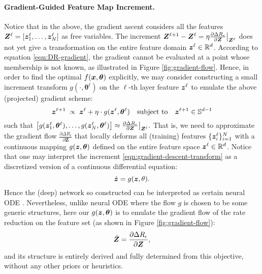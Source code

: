 \documentclass[\toplevelprefix/book-main.tex]{subfiles}
\begin{document}
\paragraph{Gradient-Guided Feature Map Increment.} Notice that in the above, the gradient ascent considers all the features $\bm{Z}^{\ell} = [\bm{z}^{\ell}_{1}, \dots, \bm{z}^{\ell}_{N}]$ as free variables. The increment $\bm{Z}^{\ell+1} - \bm{Z}^{\ell} = \eta \frac{\partial \Delta R_{\epsilon}}{\partial \bm Z}\big|_{\bm{Z}^\ell}$ does not yet give a transformation on the entire feature domain $\bm{z}^\ell \in \mathbb{R}^d$. According to equation \eqref{eqn:DR-gradient}, the gradient cannot be evaluated at a point whose membership is not known, as illustrated in Figure \ref{fig:gradient-flow}. Hence, in order to find the optimal $f(\bm{x},\bm  \theta)$ explicitly, we may consider constructing a small increment transform $g(\cdot, \bm{\theta}^{\ell})$ on the $\ell$-th layer feature $\bm{z}^\ell$ to emulate the above (projected) gradient scheme:
\begin{equation}
\bm{z}^{\ell + 1}   \; \propto \; \bm{z}^{\ell} + \eta\cdot  g(\bm{z}^{\ell}, \bm{\theta}^{\ell}) \quad \mbox{subject to} \quad \bm{z}^{\ell +1} \in \mathbb{S}^{d-1}
\label{eqn:gradient-descent-transform}
\end{equation}
such that $\big[g(\bm{z}_1^{\ell}, \bm \theta^{\ell}), \ldots, g(\bm{z}_N^{\ell}, \bm \theta^{\ell}) \big] \approx \frac{\partial \Delta R_{\epsilon}}{\partial \bm Z}\big|_{\bm{Z}^\ell}.$ That is, we need to approximate the gradient flow $\frac{\partial \Delta R_{\epsilon}}{\partial \bm Z}$ that locally deforms all (training) features $\{\bm{z}_i^\ell\}_{i=1}^N$ with a continuous mapping $g(\bm{z},\bm \theta)$ defined on the entire feature space $\bm{z}^\ell \in \mathbb{R}^d$.  
Notice that one may interpret the increment \eqref{eqn:gradient-descent-transform} as a discretized version of a continuous  differential equation:
\begin{equation}
\dot{\bm{z}} = g(\bm{z}, \theta).
\end{equation}
Hence the (deep) network so constructed can be interpreted as certain neural ODE \cite{chen2018neural}. Nevertheless, unlike neural ODE where the flow $g$ is chosen to be some generic structures, here our $g(\bm{z}, \bm\theta)$ is to emulate the gradient flow of the rate reduction on the feature set (as shown in Figure \ref{fig:gradient-flow}): 
\begin{equation*}
    \dot{\bm{Z}} = \frac{\partial \Delta R_{\epsilon}}{\partial \bm Z},
\end{equation*} 
and its structure is entirely derived and fully determined from this objective, without any other priors or heuristics.  
\end{document}
